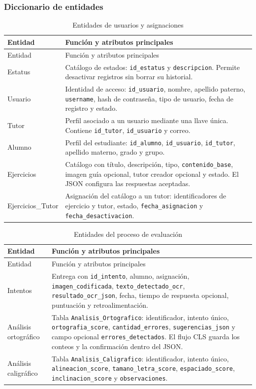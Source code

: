 \subsubsection{Diccionario de entidades}
\begin{longtable}{p{3.4cm}p{11cm}}
\caption{Entidades de usuarios y asignaciones}\label{tab:entidades_usuarios}\\
\toprule Entidad & Función y atributos principales \\ \midrule
\endfirsthead
\toprule Entidad & Función y atributos principales \\ \midrule
\endhead
Estatus & Catálogo de estados: \texttt{id\_estatus} y \texttt{descripcion}. Permite desactivar registros sin borrar su historial. \\
Usuario & Identidad de acceso: \texttt{id\_usuario}, nombre, apellido paterno, \texttt{username}, hash de contraseña, tipo de usuario, fecha de registro y estado. \\
Tutor & Perfil asociado a un usuario mediante una llave única. Contiene \texttt{id\_tutor}, \texttt{id\_usuario} y correo. \\
Alumno & Perfil del estudiante: \texttt{id\_alumno}, \texttt{id\_usuario}, \texttt{id\_tutor}, apellido materno, grado y grupo. \\
Ejercicios & Catálogo con título, descripción, tipo, \texttt{contenido\_base}, imagen guía opcional, tutor creador opcional y estado. El JSON configura las respuestas aceptadas. \\
Ejercicios\_Tutor & Asignación del catálogo a un tutor: identificadores de ejercicio y tutor, estado, \texttt{fecha\_asignacion} y \texttt{fecha\_desactivacion}. \\
\bottomrule
\end{longtable}

\begin{longtable}{p{3.4cm}p{11cm}}
\caption{Entidades del proceso de evaluación}\label{tab:entidades_evaluacion}\\
\toprule Entidad & Función y atributos principales \\ \midrule
\endfirsthead
\toprule Entidad & Función y atributos principales \\ \midrule
\endhead
Intentos & Entrega con \texttt{id\_intento}, alumno, asignación, \texttt{imagen\_codificada}, \texttt{texto\_detectado\_ocr}, \texttt{resultado\_ocr\_json}, fecha, tiempo de respuesta opcional, puntuación y retroalimentación. \\
Análisis ortográfico & Tabla \texttt{Analisis\_Ortografico}: identificador, intento único, \texttt{ortografia\_score}, \texttt{cantidad\_errores}, \texttt{sugerencias\_json} y campo opcional \texttt{errores\_detectados}. El flujo CLS guarda los conteos y la confirmación dentro del JSON. \\
Análisis caligráfico & Tabla \texttt{Analisis\_Caligrafico}: identificador, intento único, \texttt{alineacion\_score}, \texttt{tamano\_letra\_score}, \texttt{espaciado\_score}, \texttt{inclinacion\_score} y \texttt{observaciones}. \\
\bottomrule
\end{longtable}

